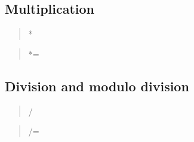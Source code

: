 
\subsection{Multiplication}

\begin{quote}
*
\end{quote}

\begin{quote}
*=
\end{quote}

\subsection{Division and modulo division}

\begin{quote}
/
\end{quote}

\begin{quote}
%
\end{quote}

\begin{quote}
/=
\end{quote}

\begin{quote}
\end{quote}


